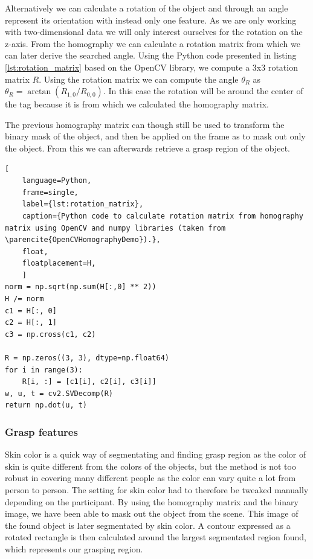 Alternatively we can calculate a rotation of the object and through an angle represent its orientation with instead only one feature. As we are only working with two-dimensional data we will only interest ourselves for the rotation on the z-axis. From the homography we can calculate a rotation matrix from which we can later derive the searched angle. Using the Python code presented in listing \ref{lst:rotation_matrix} based on the OpenCV library, we compute a 3x3 rotation matrix \(R\). Using the rotation matrix we can compute the angle \(\theta_R\) as \(\theta_R = \arctan(R_{1,0} / R_{0,0})\). In this case the rotation will be around the center of the tag because it is from which we calculated the homography matrix.

The previous homography matrix can though still be used to transform the binary mask of the object, and then be applied on the frame as to mask out only the object. From this we can afterwards retrieve a grasp region of the object.

\begin{lstlisting}[
	language=Python,
	frame=single,
	label={lst:rotation_matrix},
	caption={Python code to calculate rotation matrix from homography matrix using OpenCV and numpy libraries (taken from \parencite{OpenCVHomographyDemo}).},
	float,
	floatplacement=H,
	]
norm = np.sqrt(np.sum(H[:,0] ** 2))
H /= norm
c1 = H[:, 0]
c2 = H[:, 1]
c3 = np.cross(c1, c2)

R = np.zeros((3, 3), dtype=np.float64)
for i in range(3):
	R[i, :] = [c1[i], c2[i], c3[i]]
w, u, t = cv2.SVDecomp(R)
return np.dot(u, t)
\end{lstlisting}

\subsubsection{Grasp features}

Skin color is a quick way of segmentating and finding grasp region as the color of skin is quite different from the colors of the objects, but the method is not too robust in covering many different people as the color can vary quite a lot from person to person. The setting for skin color had to therefore be tweaked manually depending on the participant. By using the homography matrix and the binary image, we have been able to mask out the object from the scene. This image of the found object is later segmentated by skin color. A contour expressed as a rotated rectangle is then calculated around the largest segmentated region found, which represents our grasping region.

